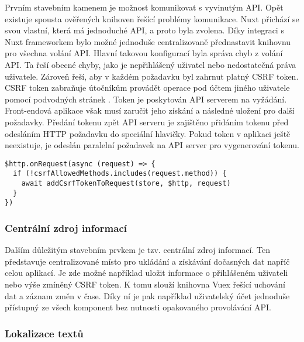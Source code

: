 		Prvním stavebním kamenem je možnost komunikovat s vyvinutým \ac{API}.
		Opět existuje spousta ověřených knihoven řešící problémy komunikace.
		Nuxt přichází se svou vlastní, která má jednoduché \ac{API}, a proto byla zvolena.
		Díky integraci s Nuxt frameworkem bylo možné jednoduše centralizovaně přednastavit knihovnu pro všechna volání \ac{API}.
		Hlavní takovou konfigurací byla správa chyb z volání \ac{API}.
		Ta řeší obecné chyby, jako je nepřihlášený uživatel nebo nedostatečná práva uživatele.
		Zároveň řeší, aby v každém požadavku byl zahrnut platný \ac{CSRF} token.
		\ac{CSRF} token zabraňuje útočníkům provádět operace pod účtem jiného uživatele pomocí podvodných stránek \cite{csrf}.
		Token je poskytován \ac{API} serverem na vyžádání.
		Front-endová aplikace však musí zaručit jeho získání a následné uložení pro další požadavky.
		Předání tokenu zpět \ac{API} serveru je zajištěno přidáním tokenu před odesláním \ac{HTTP} požadavku do speciální hlavičky.
		Pokud token v aplikaci ještě neexistuje, je odeslán paralelní požadavek na \ac{API} server pro vygenerování tokenu.

		\begin{codeblock}
			\begin{verbatim}
$http.onRequest(async (request) => {
  if (!csrfAllowedMethods.includes(request.method)) {
    await addCsrfTokenToRequest(store, $http, request)
  }
})
			\end{verbatim}
		\end{codeblock}

		\subsubsection{Centrální zdroj informací}

		Dalším důležitým stavebním prvkem je tzv. centrální zdroj informací.
		Ten představuje centralizované místo pro ukládání a získávání dočasných dat napříč celou aplikací.
		Je zde možné například uložit informace o přihlášeném uživateli nebo výše zmíněný \ac{CSRF} token.
		K tomu slouží knihovna Vuex řešící uchování dat a záznam změn v čase.
		Díky ní je pak například uživatelský účet jednoduše přístupný ze všech komponent bez nutnosti opakovaného provolávání
		\ac{API}.

		\subsubsection{Lokalizace textů}

